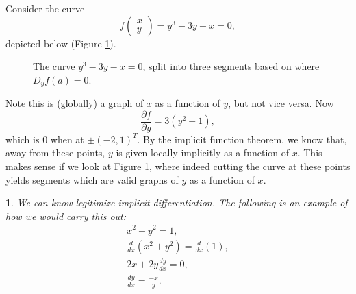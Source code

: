 \documentclass[12pt]{article}
\newtheorem{para}[theorem]{}
\begin{document}
\begin{example}
	Consider the curve 
	\begin{equation*}
		f\begin{pmatrix} x \\ y \end{pmatrix} = y^3-3y-x = 0,
	\end{equation*}
	depicted below (Figure \ref{fig_three_sect_curve}).

	\begin{figure}[h]
	\centering
	\caption{The curve $y^3-3y-x=0$, split into three segments based on where $D_yf(a)=0$.}
	\label{fig_three_sect_curve}
	\end{figure}

	Note this is (globally) a graph of $x$ as a function of $y$, but not vice versa. Now 
	\begin{equation*}
		\frac{\partial f}{\partial y} = 3(y^2-1),
	\end{equation*}
	which is $0$ when at $\pm (-2,1)^T$. By the implicit function theorem, we know that, away from these points, $y$ is given locally implicitly as a function of $x$. This makes sense if we look at Figure \ref{fig_three_sect_curve}, where indeed cutting the curve at these points yields segments which are valid graphs of $y$ as a function of $x$.
\end{example}

\begin{para} 
	We can know legitimize implicit differentiation. The following is an example of how we would carry this out:
	\begin{gather*}
		x^2+y^2=1, \\
		\frac{d}{dx}(x^2+y^2) = \frac{d}{dx}(1), \\
		2x + 2y\frac{dy}{dx} = 0, \\
		\frac{dy}{dx}=\frac{-x}{y}.
	\end{gather*}
\end{para}	
\end{document}
